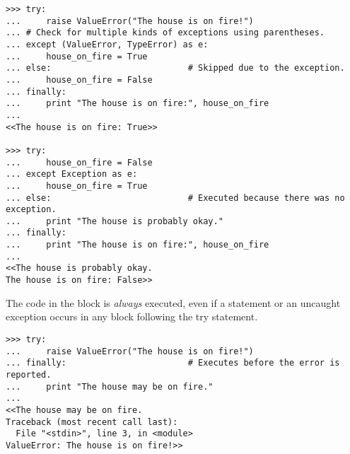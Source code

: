 
\begin{lstlisting}
>>> try:
...     raise ValueError("The house is on fire!")
... # Check for multiple kinds of exceptions using parentheses.
... except (ValueError, TypeError) as e:
...     house_on_fire = True
... else:                           # Skipped due to the exception.
...     house_on_fire = False
... finally:
...     print "The house is on fire:", house_on_fire
...
<<The house is on fire: True>>

>>> try:
...     house_on_fire = False
... except Exception as e:
...     house_on_fire = True
... else:                           # Executed because there was no exception.
...     print "The house is probably okay."
... finally:
...     print "The house is on fire:", house_on_fire
...
<<The house is probably okay.
The house is on fire: False>>
\end{lstlisting}

The code in the  block is \emph{always} executed, even if a  statement or an uncaught exception occurs in any block following the try statement.

\begin{lstlisting}
>>> try:
...     raise ValueError("The house is on fire!")
... finally:                        # Executes before the error is reported.
...     print "The house may be on fire."
...
<<The house may be on fire.
Traceback (most recent call last):
  File "<stdin>", line 3, in <module>
ValueError: The house is on fire!>>
\end{lstlisting}

\begin{comment} %
An exception that is caught by an \li{except} statement can be captured as a variable within the \li{except} block if it is declared using the keyword \li{as}.

\begin{lstlisting}
# Catch only a specific class of exceptions.
>>> try:
...     bad = 100 / 0
... except ZeroDivisionError as e:
...     print(e)
...
<<integer division or modulo by zero>>

# Here a different exception is raised than the one in the except statement.
>>> try:
...     1 + 'a' + 2 + 'b' + 3
... except ValueError as e:
...     print(e)
<<Traceback (most recent call last):
  File "<stdin>", line 2, in <module>
TypeError: unsupported operand type(s) for +: 'int' and 'str'>>

>>> try:
...     import magic
... except ImportError as e:
...     print "Sorry!", e
...
Sorry! No module named magic
\end{lstlisting}

Multiple kinds of exceptions can be caught by a single \li{except} statement using a parenthesized list of exceptions.
There can also be more than one \li{except} statements corresponding to a single \li{try} statement, each indicating which exception class(es) to catch.
An \li{else} statement can also be attached after \li{except} statements, which is only executed if the \li{try} block is executed to completion.
\end{comment}

